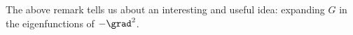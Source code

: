 \documentclass[11pt]{article}
\begin{document}

The above remark tells us about an interesting and useful idea:
expanding $G$ in the eigenfunctions of $-\grad^2$. 
\end{document}
